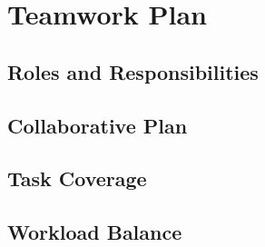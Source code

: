 \section{Teamwork Plan}
\label{sec:teamwork-plan}

\subsection{Roles and Responsibilities}
\label{subsec:roles-and-responsibilities}

\subsection{Collaborative Plan}
\label{subsec:collaborative-plan}

\subsection{Task Coverage}
\label{subsec:task-coverage}

\subsection{Workload Balance}
\label{subsec:workload-balance}
